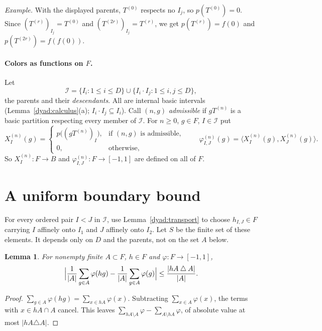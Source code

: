 \documentclass[11pt]{article}
\newcommand{\ip}[2]{\langle #1,#2\rangle}
\newtheorem{lemma}[theorem]{Lemma}
\theoremstyle{definition}
\numberwithin{equation}{section}
\begin{document}
\emph{Example.} With the displayed parents, $T^{(0)}$ respects no $I_j$, so
$p(T^{(0)})=0$. Since $(T^{(r)})_{I_j}=T^{(0)}$ and
$(T^{(2r)})_{I_j}=T^{(r)}$, we get $p(T^{(r)})=f(0)$ and
$p(T^{(2r)})=f(f(0))$.

\paragraph{Colors as functions on $F$.}
Let
\[
  \mathcal I=\{I_i:1\le i\le D\}\cup\{I_i\cdot I_j:1\le i,j\le D\},
\]
the parents and their \emph{descendants}. All are internal basic intervals
(Lemma~\ref{dyad:calculus}(a); $I_i\cdot I_j\subseteq I_i$). Call $(n,g)$
\emph{admissible} if $gT^{(n)}$ is a basic partition respecting every member
of $\mathcal I$. For $n\ge0$, $g\in F$, $I\in\mathcal I$ put
\begin{equation}\label{color:global}
  X_I^{(n)}(g)=
  \begin{cases}
    p\bigl((gT^{(n)})_I\bigr),&\text{if $(n,g)$ is admissible},\\
    0,&\text{otherwise},
  \end{cases}
  \qquad
  \varphi_{I,J}^{(n)}(g)=\ip{X_I^{(n)}(g)}{X_J^{(n)}(g)}.
\end{equation}
So $X_I^{(n)}:F\to B$ and $\varphi^{(n)}_{I,J}:F\to[-1,1]$ are defined on
all of $F$.

\section{A uniform boundary bound}\label{sec:proof}

For every ordered pair $I<J$ in $\mathcal I$, use
Lemma~\ref{dyad:transport} to choose $h_{I,J}\in F$ carrying $I$ affinely
onto $I_1$ and $J$ affinely onto $I_2$. Let $S$ be the finite set of these
elements. It depends only on $D$ and the parents, not on the set $A$ below.

\begin{lemma}\label{lem:average}
For nonempty finite $A\subset F$, $h\in F$ and $\varphi:F\to[-1,1]$,
\begin{equation}\label{eq:finite-translation}
 \Bigl|\frac1{|A|}\sum_{g\in A}\varphi(hg)
       -\frac1{|A|}\sum_{g\in A}\varphi(g)\Bigr|
 \le\frac{|hA\mathbin{\triangle}A|}{|A|}.
\end{equation}
\end{lemma}
\begin{proof}
$\sum_{g\in A}\varphi(hg)=\sum_{x\in hA}\varphi(x)$. Subtracting
$\sum_{x\in A}\varphi(x)$, the terms with $x\in hA\cap A$ cancel. This
leaves $\sum_{hA\setminus A}\varphi-\sum_{A\setminus hA}\varphi$, of
absolute value at most $|hA\triangle A|$.
\end{proof}
\end{document}
